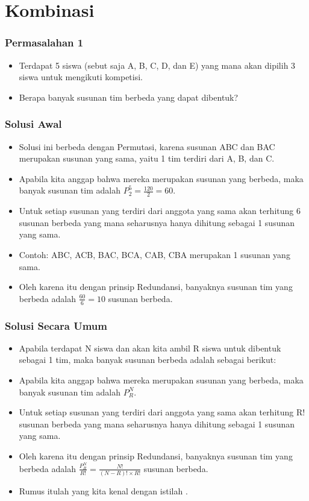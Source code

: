 \section{Kombinasi}
\frame{\sectionpage}

\begin{frame}
\frametitle{Permasalahan 1}
\begin{itemize}
  \item Terdapat 5 siswa (sebut saja A, B, C, D, dan E) yang mana akan dipilih 3 siswa untuk mengikuti kompetisi.
  \item Berapa banyak susunan tim berbeda yang dapat dibentuk?
\end{itemize}
\end{frame}

\begin{frame}
\frametitle{Solusi Awal}
\begin{itemize}
  \item Solusi ini berbeda dengan Permutasi, karena susunan ABC dan BAC merupakan susunan yang sama, yaitu 1 tim terdiri dari A, B, dan C.
  \item Apabila kita anggap bahwa mereka merupakan susunan yang berbeda, maka banyak susunan tim adalah $P^{5}_{2} = \frac{120}{2} = 60$.
  \item Untuk setiap susunan yang terdiri dari anggota yang sama akan terhitung 6 susunan berbeda yang mana seharusnya hanya dihitung sebagai 1 susunan yang sama.
  \item Contoh: ABC, ACB, BAC, BCA, CAB, CBA merupakan 1 susunan yang sama.
  \item Oleh karena itu dengan prinsip Redundansi, banyaknya susunan tim yang berbeda adalah $\frac{60}{6} = 10$ susunan berbeda.
\end{itemize}
\end{frame}

\begin{frame}
\frametitle{Solusi Secara Umum}
\begin{itemize}
  \item Apabila terdapat N siswa dan akan kita ambil R siswa untuk dibentuk sebagai 1 tim, maka banyak susunan berbeda adalah sebagai berikut:
  \item Apabila kita anggap bahwa mereka merupakan susunan yang berbeda, maka banyak susunan tim adalah $P^{N}_{R}$.
  \item Untuk setiap susunan yang terdiri dari anggota yang sama akan terhitung R! susunan berbeda yang mana seharusnya hanya dihitung sebagai 1 susunan yang sama.
  \item Oleh karena itu dengan prinsip Redundansi, banyaknya susunan tim yang berbeda adalah $\frac{P^{N}_{R}}{R!} = \frac{N!}{(N-R)! \times R!}$ susunan berbeda.
  \item Rumus itulah yang kita kenal dengan istilah .
\end{itemize}
\end{frame}

